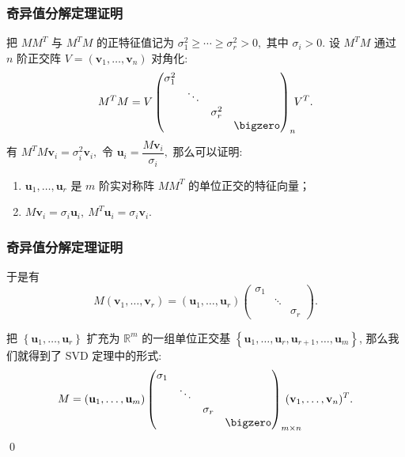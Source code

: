 
\begin{frame}
\frametitle{奇异值分解定理证明}

\startproof[bg=yellow, fg=red]
把 $MM^T$ 与 $M^TM$ 的正特征值记为 $\sigma_1^2 \geqslant \cdots \geqslant \sigma_r^2 > 0,$ 其中 $\sigma_i>0.$ 设 $M^TM$ 通过 $n$ 阶正交阵 $V = (\mathbf{v}_1,\ldots,\mathbf{v}_n)$ 对角化:
\[M^TM = V \begin{pmatrix}
\sigma_1^2 & & & \\ & \ddots & & \\ & & \sigma_r^2 & \\ & & & \bigzero \end{pmatrix}_n\!\! V^T.\]
有 $M^TM\mathbf{v}_i = \sigma_i^2\mathbf{v}_i,$ 令 $\mathbf{u}_i = \dfrac{M\mathbf{v}_i}{\sigma_i},$ 那么可以证明:

\pause

\begin{enumerate}
\item $\mathbf{u}_1, \ldots, \mathbf{u}_r$ 是 $m$ 阶实对称阵 $MM^T$ 的单位正交的特征向量；
\item $M\mathbf{v}_i = \sigma_i\mathbf{u}_i, \ M^T\mathbf{u}_i = \sigma_i\mathbf{v}_i.$
\end{enumerate}

\end{frame}


\begin{frame}
\frametitle{奇异值分解定理证明}

于是有
\[M(\mathbf{v}_1,\ldots,\mathbf{v}_r) = (\mathbf{u}_1,\ldots,\mathbf{u}_r) \begin{pmatrix}
\sigma_1 & & \\ & \ddots & \\ & & \sigma_r \end{pmatrix}.\]

\pause

把 $\left\{ \mathbf{u}_1,\ldots,\mathbf{u}_r \right\}$ 扩充为 $\mathbb{R}^m$ 的一组单位正交基 $\left\{ \mathbf{u}_1,\ldots,\mathbf{u}_r,  \mathbf{u}_{r+1},\ldots,\mathbf{u}_m \right\}$, 那么我们就得到了 SVD 定理中的形式:
\[M = (\mathbf{u}_1,\ldots,\mathbf{u}_m) \begin{pmatrix}
\sigma_1 & & & \\ & \ddots & & \\ & & \sigma_r & \\ & & & \bigzero \end{pmatrix}_{m\times n}\!\!\!\!\!\!\!\!\!\!(\mathbf{v}_1,\ldots,\mathbf{v}_n)^T.\]
\qed

\end{frame}

